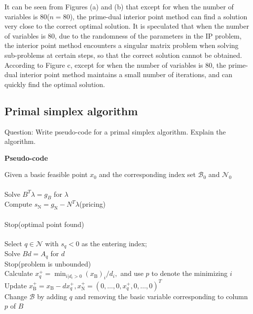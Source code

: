 It can be seen from Figures (a) and (b) that except for when the number of variables is 80($n=80$), the prime-dual interior point method can find a solution very close to the correct optimal solution. It is speculated that when the number of variables is 80, due to the randomness of the parameters in the IP problem, the interior point method encounters a singular matrix problem when solving sub-problems at certain steps, so that the correct solution cannot be obtained. According to Figure c, except for when the number of variables is 80, the prime-dual interior point method maintains a small number of iterations, and can quickly find the optimal solution.
\subsection{\bfseries Primal simplex algorithm}
\begin{shaded}
{Question: Write pseudo-code for a primal simplex algorithm. Explain the algorithm.}
\end{shaded}
{\setmainfont{Times New Roman}\bfseries Pseudo-code}
\begin{algorithm}[!h]
	\caption{Primal simplex algorithm}
	\begin{algorithmic}[1]
	    \STATE Given a basic feasible point $x_0$ and the corresponding index set $\mathcal{B}_0$ and $\mathcal{N}_0$\\
        \\
		\STATE Solve $B^{T} \lambda=g_{B}$ for $\lambda$\\
		\STATE Compute $s_{\mathrm{N}}=g_{\mathrm{N}}-N^{T} \lambda$(pricing)\\
		\\
		\STATE Stop(optimal point found)\\
		\ENDIF\\
		\STATE Select $q \in \mathcal{N}$ with $s_{q}<0$ as the entering index;\\
		\STATE Solve $B d=A_{q}$ for $d$\\
		\STATE Stop(problem is unbounded)\\
		\ENDIF
		\STATE Calculate $x_{q}^{+}=\min _{i | d_{i}>0}\left(x_{\mathrm{B}}\right)_{i} / d_{i},$ and use $p$ to denote the minimizing $i$\\
		\STATE Update $x_{\mathrm{B}}^{+}=x_{\mathrm{B}}-d x_{q}^{+}, x_{\mathrm{N}}^{+}=\left(0, \ldots, 0, x_{q}^{+}, 0, \ldots, 0\right)^{T}$\\
		\STATE Change $\mathcal{B}$ by adding $q$ and removing the basic variable corresponding to column $p$ of $B$\\
		\ENDWHILE
    \end{algorithmic}
\end{algorithm}\\


